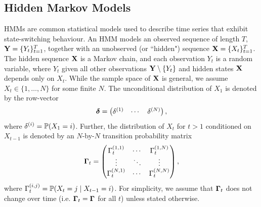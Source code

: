 \subsection{Hidden Markov Models}

HMMs are common statistical models used to describe time series that exhibit state-switching behaviour. An HMM models an observed sequence of length $T$, $\mathbf{Y} = \{Y_t\}_{t=1}^T$, together with an unobserved (or  ``hidden") sequence $\mathbf{X} = \{X_t\}_{t=1}^T$. The hidden sequence $\mathbf{X}$ is a Markov chain, and each observation $Y_t$ is a random variable, where $Y_t$ given all other observations $\mathbf{Y} \setminus \{Y_t\}$ and hidden states $\mathbf{X}$ depends only on $X_t$. While the sample space of $\mathbf{X}$ is general, we assume $X_t \in \{1,\ldots,N\}$ for some finite $N$. The unconditional distribution of $X_1$ is denoted by the row-vector
%
\begin{equation}
    \boldsymbol{\delta} = \begin{pmatrix} \delta^{(1)} & \cdots & \delta^{(N)} \end{pmatrix},
\end{equation}
%
where $\delta^{(i)} = \mathbb{P}(X_1 = i)$. Further, the distribution of $X_t$ for $t > 1$ conditioned on $X_{t-1}$ is denoted by an $N$-by-$N$ transition probability matrix 
%
\begin{equation}
    \boldsymbol{\Gamma}_t = \begin{pmatrix} 
    \Gamma_t^{(1,1)} & \cdots & \Gamma_t^{(1,N)} \\
    \vdots & \ddots & \vdots \\
    \Gamma_t^{(N,1)} & \cdots & \Gamma_t^{(N,N)} \\
    \end{pmatrix},
\end{equation}
%
where $\Gamma_t^{(i,j)} = \mathbb{P}(X_t = j \mid X_{t-1} = i)$. %
For simplicity, we assume that $\boldsymbol{\Gamma}_t$ does not change over time (i.e. $\boldsymbol{\Gamma}_t = \boldsymbol{\Gamma}$ for all $t$) unless stated otherwise. 


